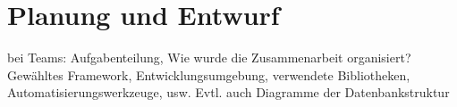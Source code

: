 
\chapter{Planung und Entwurf}\label{ch:planung-und-entwurf}
bei Teams: Aufgabenteilung, Wie wurde die Zusammenarbeit organisiert?
Gewähltes Framework, Entwicklungsumgebung, verwendete Bibliotheken, Automatisierungswerkzeuge, usw.
Evtl. auch Diagramme der Datenbankstruktur